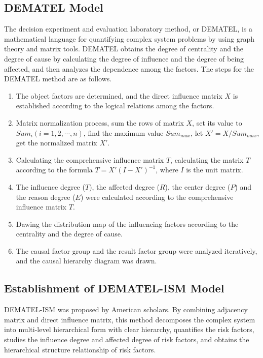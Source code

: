 \documentclass[12pt]{article}  %
\begin{document}
\subsection{DEMATEL Model}
The decision experiment and evaluation laboratory method, or DEMATEL, is a mathematical language for quantifying complex system problems by using graph theory and matrix tools. DEMATEL obtains the degree of centrality and the degree of cause by calculating the degree of influence and the degree of being affected, and then analyzes the dependence among the factors. The steps for the DEMATEL method are as follows.
\begin{enumerate}
    \renewcommand{\labelenumi}{\textbf{Step \theenumi}}
\item The object factors are determined, and the direct influence matrix $X$ is established according to the logical relations among the factors.

\item Matrix normalization process, sum the rows of matrix $X$, set its value to $Sum_i (i=1,2,\cdots ,n)$, find the maximum value $Sum_{max}$, let $X'=X/Sum_{max}$, get the normalized matrix $X'$.
\item Calculating the comprehensive influence matrix $T$, calculating the matrix $T$ according to the formula $T = X'(I-X')^{-1}$, where $I$ is the unit matrix.
\item The influence degree ($T$), the affected degree ($R$), the center degree ($P$) and the reason degree ($E$) were calculated according to the comprehensive influence matrix $T$.
\item Dawing the distribution map of the influencing factors according to the centrality and the degree of cause.
\item The causal factor group and the result factor group were analyzed iteratively, and the causal hierarchy diagram was drawn.
\end{enumerate}
\subsection{Establishment of DEMATEL-ISM Model}
DEMATEL-ISM was proposed by American scholars. By combining adjacency matrix and direct influence matrix, this method decomposes the complex system into multi-level hierarchical form with clear hierarchy, quantifies the risk factors, studies the influence degree and affected degree of risk factors, and obtains the hierarchical structure relationship of risk factors.
\end{document}
